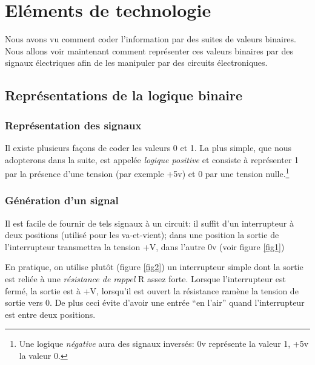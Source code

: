 \chapter{El\'ements de technologie}

Nous avons vu comment coder l'information par des
suites de valeurs binaires. Nous allons voir maintenant comment
repr\'esenter ces valeurs binaires par des signaux \'electriques
afin de les manipuler par des circuits \'electroniques.


\section{Repr\'esentations de la logique binaire}

\subsection{Repr\'esentation des signaux}


Il existe plusieurs fa\c{c}ons de coder les valeurs 0 et 1. La plus simple,
que nous adopterons dans la suite, est appel\'ee {\em logique positive} 
et consiste \`a repr\'esenter 1 par la pr\'esence
d'une tension (par exemple +5v) et 0 par une 
tension nulle.\footnote{
Une logique {\em n\'egative} aura des signaux invers\'es:
 0v repr\'esente la valeur 1,  +5v la valeur 0.}


\subsection{G\'en\'eration d'un signal}

Il est facile de fournir de tels signaux \`a un circuit: il suffit
d'un interrupteur \`a deux positions  (utilis\'e pour les va-et-vient); 
dans une position la sortie de l'interrupteur transmettra la tension +V, 
dans l'autre 0v (voir figure \ref{fig1})


En pratique, on utilise plutôt (figure \ref{fig2})
un interrupteur simple dont la sortie est reli\'ee
\`a une {\em r\'esistance de rappel} R assez forte. 
Lorsque l'interrupteur est ferm\'e,
la sortie est \`a +V, lorsqu'il est ouvert la r\'esistance ram\`ene 
la tension de sortie vers 0. De plus ceci évite d'avoir une entrée
``en l'air'' quand l'interrupteur est entre deux positions.


